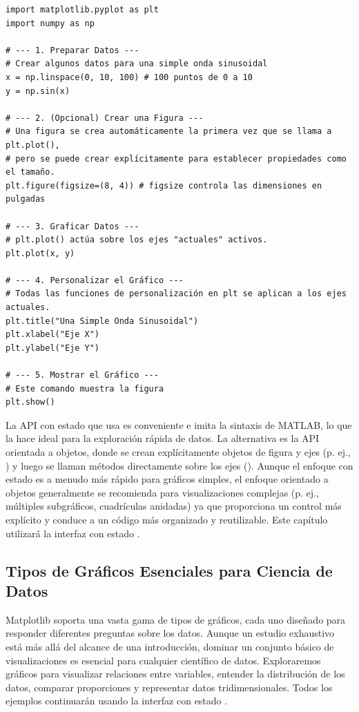 \begin{example}
\text{ }\begin{verbatim}
import matplotlib.pyplot as plt
import numpy as np

# --- 1. Preparar Datos ---
# Crear algunos datos para una simple onda sinusoidal
x = np.linspace(0, 10, 100) # 100 puntos de 0 a 10
y = np.sin(x)

# --- 2. (Opcional) Crear una Figura ---
# Una figura se crea automáticamente la primera vez que se llama a plt.plot(),
# pero se puede crear explícitamente para establecer propiedades como el tamaño.
plt.figure(figsize=(8, 4)) # figsize controla las dimensiones en pulgadas

# --- 3. Graficar Datos ---
# plt.plot() actúa sobre los ejes "actuales" activos.
plt.plot(x, y)

# --- 4. Personalizar el Gráfico ---
# Todas las funciones de personalización en plt se aplican a los ejes actuales.
plt.title("Una Simple Onda Sinusoidal")
plt.xlabel("Eje X")
plt.ylabel("Eje Y")

# --- 5. Mostrar el Gráfico ---
# Este comando muestra la figura
plt.show()
\end{verbatim}
\end{example}

\begin{remark}
La API con estado que usa  es conveniente e imita la sintaxis de MATLAB, lo que la hace ideal para la exploración rápida de datos. La alternativa es la API orientada a objetos, donde se crean explícitamente objetos de figura y ejes (p. ej., ) y luego se llaman métodos directamente sobre los ejes (). Aunque el enfoque con estado es a menudo más rápido para gráficos simples, el enfoque orientado a objetos generalmente se recomienda para visualizaciones complejas (p. ej., múltiples subgráficos, cuadrículas anidadas) ya que proporciona un control más explícito y conduce a un código más organizado y reutilizable. Este capítulo utilizará la interfaz con estado .
\end{remark}

\subsection{Tipos de Gráficos Esenciales para Ciencia de Datos}
\label{subsec:plot_types}
Matplotlib soporta una vasta gama de tipos de gráficos, cada uno diseñado para responder diferentes preguntas sobre los datos. Aunque un estudio exhaustivo está más allá del alcance de una introducción, dominar un conjunto básico de visualizaciones es esencial para cualquier científico de datos. Exploraremos gráficos para visualizar relaciones entre variables, entender la distribución de los datos, comparar proporciones y representar datos tridimensionales. Todos los ejemplos continuarán usando la interfaz con estado .

